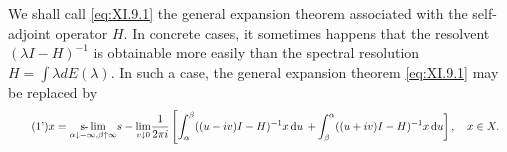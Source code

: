 We shall call \eqref{eq:XI.9.1} the general expansion theorem associated with the self-adjoint operator $H$. In concrete cases, it sometimes happens that the resolvent $(\lambda I - H)^{-1}$ is obtainable more easily than the spectral resolution $H = \int \lambda dE(\lambda)$. In such a case, the general expansion theorem \eqref{eq:XI.9.1}  
may be replaced by 
\begin{equation}\tag{1'}\label{eq:XI.9.1'}
\begin{aligned}
&x = \underset {\alpha \downarrow - \infty , \beta \uparrow \infty} {\text{s-}\lim} s - \underset {v \downarrow 0} {\lim} \frac {1}{2 \pi i} \left[ \int_{\alpha} ^{\beta} ((u - i v) I - H) ^{-1} x \mathop{}\!\mathrm{d} u \right. \left. + \int_{\beta} ^{\alpha} ((u + i v) I - H) ^{-1} x \mathop{}\!\mathrm{d} u \right], \quad x \in X.
\end{aligned}
\end{equation}

